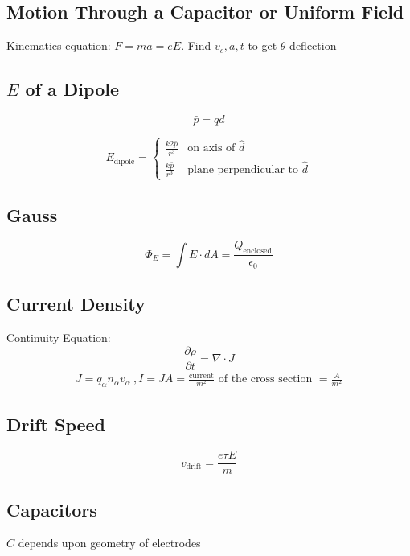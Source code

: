 \documentclass[10pt,a4paper]{article}
\begin{document}
\subsection{Motion Through a Capacitor or Uniform Field}
Kinematics equation: $F = ma = eE$. Find $v_c,a,t$ to get $\theta$ deflection

\subsection{$E$ of a Dipole}
\begin{equation}
 \bar{p} = qd 
\end{equation}

\[
 E_{\textrm{dipole}} =
  \begin{cases}
   \frac{k2\bar{p}}{r^3} & \textrm{on axis of }\hat{d} \\
   \frac{k\bar{p}}{r^3} & \textrm{plane perpendicular to }\hat{d}
  \end{cases}
\]

\subsection{Gauss}
\begin{equation}
 \Phi_E = \int E \cdot dA = \frac{Q_{\textrm{enclosed}}}{\epsilon_0}
\end{equation}

\subsection{Current Density}
Continuity Equation:
\begin{equation}
 \frac{\partial \rho}{\partial t} = \overline{\nabla} \cdot \bar{J}
\end{equation}
\begin{align}
 J = q_\alpha n_\alpha v_\alpha~, I = JA = \frac{\textrm{current}}{m^2} \textrm{ of the cross section }= \frac{A}{m^2}
\end{align}

\subsection{Drift Speed}
\begin{equation}
 v_{\textrm{drift}} = \frac{e \tau E}{m}
\end{equation}

\subsection{Capacitors}
$C$ depends upon geometry of electrodes
\end{document}
